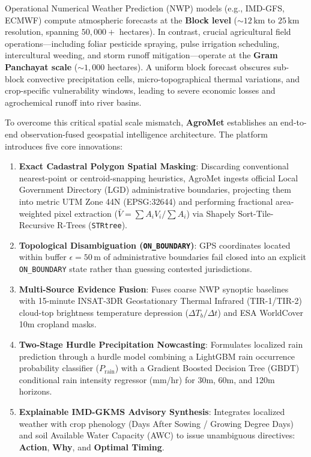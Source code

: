 \documentclass[11pt,a4paper,oneside]{report}
\begin{document}
\noindent Operational Numerical Weather Prediction (NWP) models (e.g., IMD-GFS, ECMWF) compute atmospheric forecasts at the \textbf{Block level} ($\sim 12\,\text{km}$ to $25\,\text{km}$ resolution, spanning $50,000+$ hectares). In contrast, crucial agricultural field operations—including foliar pesticide spraying, pulse irrigation scheduling, intercultural weeding, and storm runoff mitigation—operate at the \textbf{Gram Panchayat scale} ($\sim 1,000$ hectares). A uniform block forecast obscures sub-block convective precipitation cells, micro-topographical thermal variations, and crop-specific vulnerability windows, leading to severe economic losses and agrochemical runoff into river basins.

To overcome this critical spatial scale mismatch, \textbf{AgroMet} establishes an end-to-end observation-fused geospatial intelligence architecture. The platform introduces five core innovations:
\begin{enumerate}[leftmargin=*]
    \item \textbf{Exact Cadastral Polygon Spatial Masking}: Discarding conventional nearest-point or centroid-snapping heuristics, AgroMet ingests official Local Government Directory (LGD) administrative boundaries, projecting them into metric UTM Zone 44N (EPSG:32644) and performing fractional area-weighted pixel extraction ($\bar{V} = \sum A_i V_i / \sum A_i$) via Shapely Sort-Tile-Recursive R-Trees (\texttt{STRtree}).
    \item \textbf{Topological Disambiguation (\texttt{ON\_BOUNDARY})}: GPS coordinates located within buffer $\epsilon = 50\,\text{m}$ of administrative boundaries fail closed into an explicit \texttt{ON\_BOUNDARY} state rather than guessing contested jurisdictions.
    \item \textbf{Multi-Source Evidence Fusion}: Fuses coarse NWP synoptic baselines with 15-minute INSAT-3DR Geostationary Thermal Infrared (TIR-1/TIR-2) cloud-top brightness temperature depression ($\Delta T_b / \Delta t$) and ESA WorldCover 10m cropland masks.
    \item \textbf{Two-Stage Hurdle Precipitation Nowcasting}: Formulates localized rain prediction through a hurdle model combining a LightGBM rain occurrence probability classifier ($P_{\text{rain}}$) with a Gradient Boosted Decision Tree (GBDT) conditional rain intensity regressor (mm/hr) for 30m, 60m, and 120m horizons.
    \item \textbf{Explainable IMD-GKMS Advisory Synthesis}: Integrates localized weather with crop phenology (Days After Sowing / Growing Degree Days) and soil Available Water Capacity (AWC) to issue unambiguous directives: \textbf{Action}, \textbf{Why}, and \textbf{Optimal Timing}.
\end{enumerate}
\end{document}
